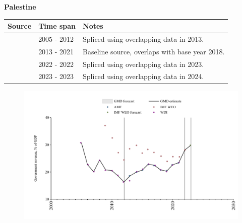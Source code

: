 \documentclass[12pt,a4paper,landscape]{article}
\begin{document}
\begin{adjustbox}{max totalsize={\paperwidth}{\paperheight},center}
\begin{minipage}[t][\textheight][t]{\textwidth}
\vspace*{0.5cm}
{}
\begin{center}
{\Large\bfseries Palestine}
\end{center}
\vspace{0.5cm}
\begin{table}[H]
\centering
\small
\begin{tabular}{|l|l|l|}
\hline
\textbf{Source} & \textbf{Time span} & \textbf{Notes} \\
\hline
\rowcolor{white}\cite{WDI}& 2005 - 2012 &Spliced using overlapping data in 2013.\\
\rowcolor{lightgray}\cite{AMF}& 2013 - 2021 &Baseline source, overlaps with base year 2018.\\
\rowcolor{white}\cite{IMF_WEO}& 2022 - 2022 &Spliced using overlapping data in 2023.\\
\rowcolor{lightgray}\cite{IMF_WEO_forecast}& 2023 - 2023 &Spliced using overlapping data in 2024.\\
\hline
\end{tabular}
\end{table}
\begin{figure}[H]
\centering
\includegraphics[width=\textwidth,height=0.6\textheight,keepaspectratio]{graphs/PSE_govrev_GDP.pdf}
\end{figure}
\end{minipage}
\end{adjustbox}
\end{document}
